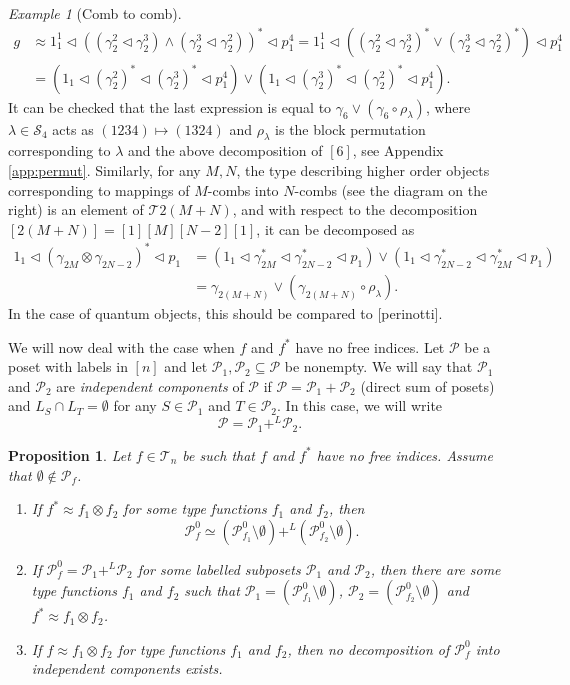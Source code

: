 \documentclass[12pt]{article}
\newtheorem{prop}{Proposition}
\theoremstyle{definition}
\theoremstyle{remark}
\newtheorem{exm}{Example}
\def\indep{+^L}
\def\Te{\mathcal T}
\def\Pe{\mathcal P}
\def\permut{\mathscr{S}}
\def\vtl{\vartriangleleft}
\begin{document}
\begin{exm}[Comb to comb]
\begin{align*}
g&\approx 1^1_1\vtl((\gamma_2^2\vtl \gamma_2^3)\wedge (\gamma_2^3\vtl \gamma_2^2))^*\vtl
p^4_1=
1^1_1\vtl((\gamma_2^2\vtl \gamma_2^3)^*\vee(\gamma_2^3\vtl\gamma_2^2)^*)\vtl p^4_1\\
&=(1_1\vtl (\gamma^2_2)^*\vtl (\gamma_2^3)^*\vtl p_1^4)\vee (1_1\vtl (\gamma^3_2)^*\vtl
(\gamma_2^2)^*\vtl p_1^4).
\end{align*}
It can be checked that the last expression is equal to $\gamma_6\vee (\gamma_6\circ
\rho_\lambda)$, where $\lambda\in \permut_4$  acts as $(1234)\mapsto (1324)$ and
$\rho_\lambda$ is the block permutation corresponding to $\lambda$ and the above
decomposition of $[6]$, see Appendix \ref{app:permut}. Similarly, for any $M,N$, the type
describing higher order objects corresponding to mappings of $M$-combs into $N$-combs (see
the diagram on the right) is
an element of $\Te{2(M+N)}$, and  with respect to the decomposition
$[2(M+N)]=[1][M][N-2][1]$,  it can be decomposed as
\begin{align*}
1_1\vtl(\gamma_{2M}\otimes \gamma_{2N-2})^*\vtl p_1&=(1_1\vtl \gamma^*_{2M}\vtl
\gamma_{2N-2}^*\vtl p_1)\vee (1_1\vtl \gamma^*_{2N-2}\vtl
\gamma_{2M}^*\vtl p_1)\\
&=\gamma_{2(M+N)}\vee (\gamma_{2(M+N)}
\circ\rho_\lambda).
\end{align*}
In the case of quantum objects, this should be compared to [perinotti].

\end{exm}





We will now deal with the case when $f$ and $f^*$ have no free indices.
Let $\Pe$ be a poset with labels in $[n]$ and let $\Pe_1,\Pe_2\subseteq \Pe$ be nonempty. We will say that $\Pe_1$ and $\Pe_2$ are {\em independent
components} of $\Pe$ if $\Pe=\Pe_1+\Pe_2$ (direct sum of posets) and $L_S\cap L_T=\emptyset$ for 
any $S\in \Pe_1$ and $T\in \Pe_2$. In this case, we will write
\[
\Pe=\Pe_1\indep \Pe_2.
\]


\begin{prop}\label{prop:nofree_components} Let $f\in \Te_n$ be such that $f$ and  $f^*$ have no
free indices. Assume that $\emptyset \notin \Pe_{f}$. 
\begin{enumerate}
\item[(i)] If $f^*\approx f_1\otimes f_2$ for some type functions $f_1$ and
$f_2$, then 
\[
\Pe_f^0\simeq (\Pe_{f_1}^0\setminus \emptyset) \indep  (\Pe_{f_2}^0\setminus
\emptyset).
\]
\item[(ii)] If $\Pe_f^0=\Pe_1\indep \Pe_2$ for some labelled subposets $\Pe_1$ and $\Pe_2$, 
then there are some type functions $f_1$ and $f_2$ such that $\Pe_1=(\Pe_{f_1}^0\setminus
\emptyset)$, $\Pe_2=(\Pe_{f_2}^0\setminus \emptyset)$ and
$f^*\approx f_1\otimes f_2$.
\item[(iii)] If $f\approx f_1\otimes f_2$ for type functions $f_1$ and
$f_2$, then no 
decomposition of $\Pe_f^0$ into independent components exists.

\end{enumerate}

\end{prop}
\end{document}
